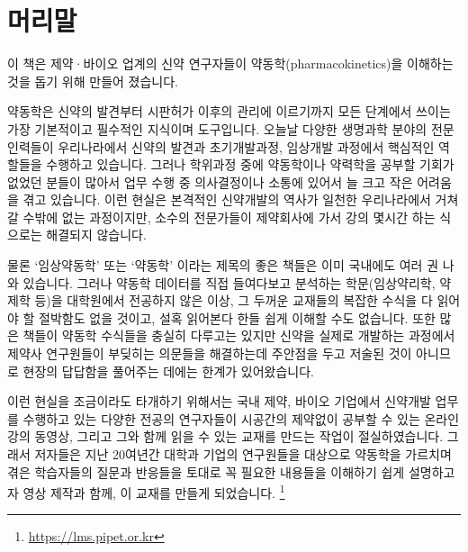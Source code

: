 \documentclass[
  11pt,
  krantz2, a4paper, twoside]{krantz}
\theoremstyle{definition}
\theoremstyle{definition}
\theoremstyle{definition}
\theoremstyle{definition}
\theoremstyle{remark}
\begin{document}
\setlength{\abovedisplayskip}{-5pt}
\setlength{\abovedisplayshortskip}{-5pt}

\newpage\thispagestyle{empty}\null

{
\hypersetup{linkcolor=}
\setcounter{tocdepth}{2}
\tableofcontents
}
\listoffigures
\listoftables
{}
\hypertarget{uxba38uxb9acuxb9d0}{%
\chapter*{머리말}\label{uxba38uxb9acuxb9d0}}


\normalsize

이 책은 제약·바이오 업계의 신약 연구자들이 약동학(pharmacokinetics)을 이해하는 것을 돕기 위해 만들어 졌습니다.

약동학은 신약의 발견부터 시판허가 이후의 관리에
이르기까지 모든 단계에서 쓰이는 가장 기본적이고 필수적인 지식이며
도구입니다. 오늘날 다양한 생명과학 분야의 전문인력들이 우리나라에서
신약의 발견과 초기개발과정, 임상개발 과정에서 핵심적인 역할들을 수행하고
있습니다. 그러나 학위과정 중에 약동학이나 약력학을 공부할 기회가 없었던
분들이 많아서 업무 수행 중 의사결정이나 소통에 있어서 늘 크고 작은
어려움을 겪고 있습니다. 이런 현실은 본격적인 신약개발의 역사가 일천한
우리나라에서 거쳐갈 수밖에 없는 과정이지만, 소수의 전문가들이 제약회사에
가서 강의 몇시간 하는 식으로는 해결되지 않습니다.

물론 `임상약동학' 또는 `약동학' 이라는 제목의 좋은 책들은 이미 국내에도
여러 권 나와 있습니다. 그러나 약동학 데이터를 직접 들여다보고 분석하는
학문(임상약리학, 약제학 등)을 대학원에서 전공하지 않은 이상, 그 두꺼운
교재들의 복잡한 수식을 다 읽어야 할 절박함도 없을 것이고, 설혹 읽어본다
한들 쉽게 이해할 수도 없습니다. 또한 많은 책들이 약동학 수식들을 충실히
다루고는 있지만 신약을 실제로 개발하는 과정에서 제약사 연구원들이
부딪히는 의문들을 해결하는데 주안점을 두고 저술된 것이 아니므로 현장의
답답함을 풀어주는 데에는 한계가 있어왔습니다.

이런 현실을 조금이라도 타개하기 위해서는 국내 제약, 바이오 기업에서
신약개발 업무를 수행하고 있는 다양한 전공의 연구자들이 시공간의 제약없이
공부할 수 있는 온라인 강의 동영상, 그리고 그와 함께 읽을 수 있는 교재를
만드는 작업이 절실하였습니다. 그래서 저자들은 지난 20여년간 대학과
기업의 연구원들을 대상으로 약동학을 가르치며 겪은 학습자들의 질문과
반응들을 토대로 꼭 필요한 내용들을 이해하기 쉽게 설명하고자 영상 제작과
함께, 이 교재를 만들게 되었습니다. \footnote{\url{https://lms.pipet.or.kr}}
\end{document}
